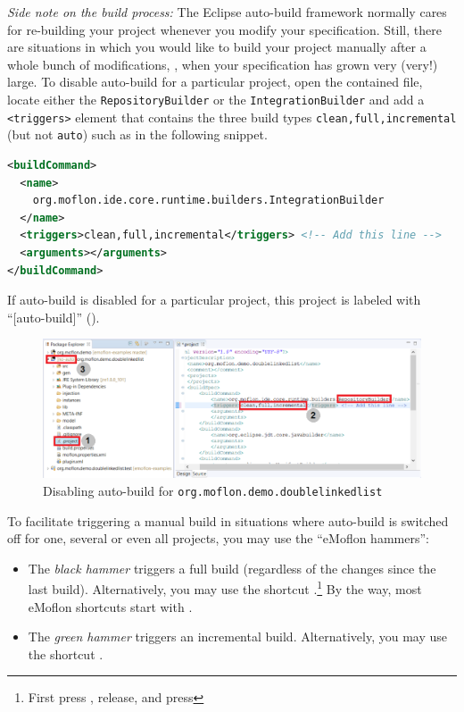 \emph{Side note on the build process:}
The Eclipse auto-build framework normally cares for re-building your project whenever you modify your specification.
Still, there are situations in which you would like to build your project manually after a whole bunch of modifications, \eg, when your specification has grown very (very!) large.
To disable auto-build for a particular project, open the contained  file, locate either the \texttt{RepositoryBuilder} or the \texttt{IntegrationBuilder} and add a \texttt{<triggers>} element that contains the three build types \texttt{clean,full,incremental} (but not \texttt{auto}) such as in the following snippet.
\begin{lstlisting}[language=XML]
<buildCommand>
  <name>
    org.moflon.ide.core.runtime.builders.IntegrationBuilder
  </name>
  <triggers>clean,full,incremental</triggers> <!-- Add this line -->
  <arguments></arguments>
</buildCommand>
\end{lstlisting}
If auto-build is disabled for a particular project, this project is labeled with \enquote{[auto-build]} ().
%
\begin{figure}[htbp]
    \centering
    \includegraphics[width=\textwidth]{../../org.moflon.doc.handbook.01_installation/2_simpleDemo/EADemo/images/ea_noAutoBuild}
    \caption{Disabling auto-build for \texttt{org.moflon.demo.doublelinkedlist}} 
    \label{ea:noAutoBuild} 
\end{figure}
To facilitate triggering a manual build in situations where auto-build is switched off for one, several or even all projects, you may use the \enquote{eMoflon hammers}:
\begin{itemize}[*]
    \item
    The \emph{black hammer} \eMoflonFullBuildIcon triggers a full build (regardless of the changes since the last build).
    Alternatively, you may use the shortcut \linebreak {}.\footnote{First press , release, and press }
    By the way, most eMoflon shortcuts start with \linebreak{}.
    \item 
    The \emph{green hammer} \eMoflonIncrementalBuildIcon triggers an incremental build.
    Alternatively, you may use the shortcut .
\end{itemize}